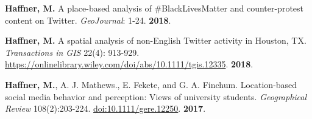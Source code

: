 




\begin{cventries}
   \cventry
      {}
      {}
      {}
      {}
      {
        \begin{cvitems}
          \vspace{-4mm}
        \item
          {\textbf{Haffner, M.}
            A place-based analysis of \#BlackLivesMatter and counter-protest
            content on Twitter. \textit{GeoJournal}: 1-24. \textbf{2018}.} \\
          \vspace{-2mm}
        \end{cvitems}
    }

   \cventry
      {}
      {}
      {}
      {}
      {
        \begin{cvitems}
          \vspace{-4mm}
        \item {\textbf{Haffner, M.} A spatial analysis of non-English Twitter
            activity in Houston, TX. \textit{Transactions in GIS} 22(4):
            913-929. \href{https://onlinelibrary.wiley.com/doi/abs/10.1111/tgis.12335}{https://onlinelibrary.wiley.com/doi/abs/10.1111/tgis.12335}.}
            \textbf{2018}. \\
          \vspace{-2mm}
        \end{cvitems}
    }

   \cventry
      {}
      {}
      {}
      {}
      {
        \begin{cvitems}
          \vspace{-4mm} \item {\textbf{Haffner, M.}, A. J. Mathews., E. Fekete, and
            G. A. Finchum. Location-based social media behavior and perception:
            Views of university students. \textit{Geographical Review} 108(2):203-224.
            \href{http://onlinelibrary.wiley.com/doi/10.1111/gere.12250/abstract}{doi:10.1111/gere.12250}.}
          \textbf{2017}.
          \\
          \vspace{-2mm}
        \end{cvitems}
    } %


\end{cventries}

